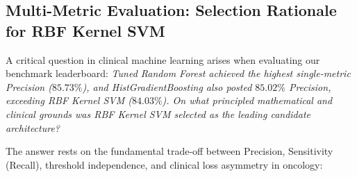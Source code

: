 \documentclass[11pt,a4paper]{article}
\begin{document}
\subsection{Multi-Metric Evaluation: Selection Rationale for RBF Kernel SVM}
A critical question in clinical machine learning arises when evaluating our benchmark leaderboard: \textit{Tuned Random Forest achieved the highest single-metric Precision ($85.73\%$), and HistGradientBoosting also posted $85.02\%$ Precision, exceeding RBF Kernel SVM ($84.03\%$). On what principled mathematical and clinical grounds was RBF Kernel SVM selected as the leading candidate architecture?}

The answer rests on the fundamental trade-off between Precision, Sensitivity (Recall), threshold independence, and clinical loss asymmetry in oncology:
\end{document}
